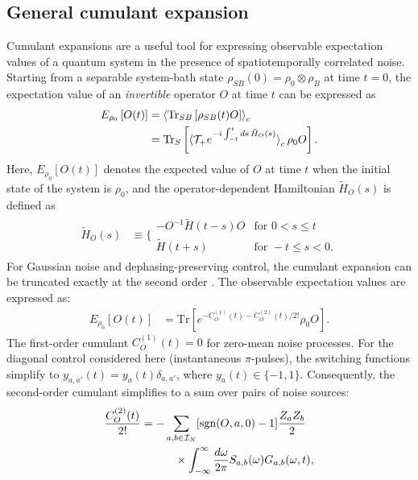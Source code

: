\documentclass[%
 reprint,
superscriptaddress,
 amsmath,amssymb,
 aps,
pra,
]{revtex4-2}
\begin{document}
\subsection{General cumulant expansion}
\label{app::cumu}
Cumulant expansions are a useful tool for expressing observable expectation values of a quantum system in the presence of spatiotemporally correlated noise. Starting from a separable system-bath state $\rho_{SB}(0)=\rho_0\otimes\rho_B$ at time $t=0$, the expectation value of an \textit{invertible} operator $O$ at time $t$ can be expressed as \cite{PhysRevA.95.022121}
\begin{align} 
    E_{\rho_0}\left[O(t)\right]&=\braket{\text{Tr}_{SB}\left[\rho_{SB}(t)O\right]}_c \nonumber\\
    &=\text{Tr}_{S}\left[\braket{\mathcal{T}_+e^{-i\int_{-t}^tds\,\tilde{H}_O(s)}}_{c}\rho_{0}O\right].
\end{align}
Here, $E_{\rho_0}[O(t)]$ denotes the expected value of $O$ at time $t$ when the initial state of the system is $\rho_0$, and the operator-dependent Hamiltonian $\tilde{H}_O(s)$ is defined as
\begin{align}
    \tilde{H}_O(s)&\equiv\Bigg\{\begin{matrix}
        -O^{-1}\tilde{H}(t-s)O & \text{for }0<s\leq t\\
        \tilde{H}(t+s) & \text{for }-t\leq s < 0.
    \end{matrix}
\end{align}
For Gaussian noise and dephasing-preserving control, the cumulant expansion can be truncated exactly at the second order \cite{CombMultiaxis}. The observable expectation values are expressed as:
\begin{align}
\label{eq::expcumu}
    E_{\rho_0}[O(t)]&=\text{Tr}\left[e^{-C_O^{(1)}(t)-C_O^{(2)}(t)/2!}\rho_0 O\right].
\end{align}
The first-order cumulant $C_O^{(1)}(t)=0$ for zero-mean noise processes. For the diagonal control considered here (instantaneous $\pi$-pulses), the switching functions simplify to $y_{a,a'}(t) = y_a(t)\delta_{a,a'}$, where $y_a(t) \in \{-1, 1\}$. Consequently, the second-order cumulant simplifies to a sum over pairs of noise sources:
\begin{align}
    \frac{C_{O}^{(2)}(t)}{2!}&=-\sum_{a,b\in\mathcal{I}_N}[\text{sgn}(O,a,0)-1]\frac{Z_aZ_b}{2}\notag\\
    &\qquad\quad\times\int_{-\infty}^{\infty}\frac{d\omega}{2\pi}S_{a,b}(\omega)G_{a,b}(\omega,t),
    \label{eq::c2_spectra}
\end{align}
\end{document}
